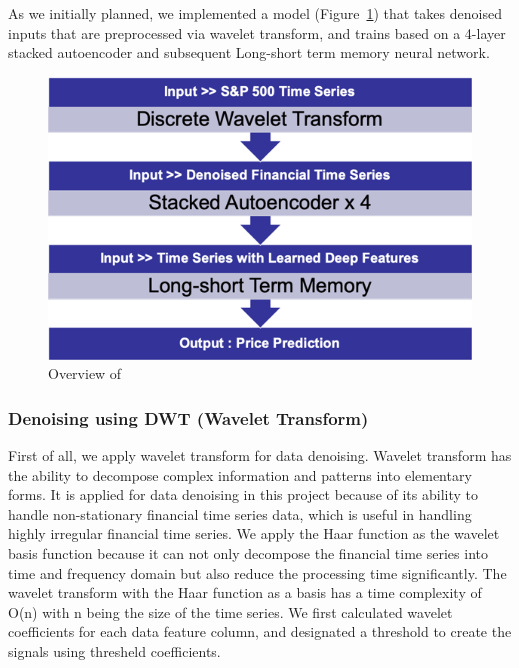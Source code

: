 As we initially planned, we implemented a model (Figure~\ref{fig-overview}) that takes denoised inputs that are preprocessed via wavelet transform, and trains based on a 4-layer stacked autoencoder and subsequent Long-short term memory neural network.

\begin{figure}[htpb]
\begin{center}
\includegraphics[width=0.6\linewidth]{./figs/flow}%
\caption{Overview of \scheme}
\label{fig-overview}
\end{center}
\vspace{-0.6cm}
\end{figure}

\subsubsection{Denoising using DWT (Wavelet Transform)}
First of all, we apply wavelet transform for data denoising. Wavelet transform has the ability to decompose complex information and patterns into elementary forms. It is applied for data denoising in this project because of its ability to handle non-stationary financial time series data, which is useful in handling highly irregular financial time series. We apply the Haar function as the wavelet basis function because it can not only decompose the financial time series into time and frequency domain but also reduce the processing time significantly. The wavelet transform with the Haar function as a basis has a time complexity of O(n) with n being the size of the time series. We first calculated wavelet coefficients for each data feature column, and designated a threshold to create the signals using thresheld coefficients. 

